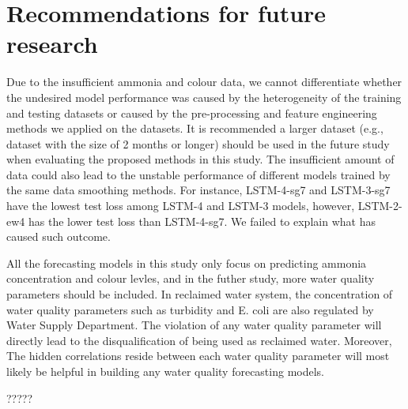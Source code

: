 \section{Recommendations for future research}
Due to the insufficient ammonia and colour data, we cannot differentiate whether the undesired model performance was caused by the heterogeneity of the training and testing datasets or caused by the pre-processing and feature engineering methods we applied on the datasets. It is recommended a larger dataset (e.g., dataset with the size of 2 months or longer) should be used in the future study when evaluating the proposed methods in this study. The insufficient amount of data could also lead to the unstable performance of different models trained by the same data smoothing methods. For instance, LSTM-4-sg7 and LSTM-3-sg7 have the lowest test loss among LSTM-4 and LSTM-3 models, however, LSTM-2-ew4 has the lower test loss than LSTM-4-sg7. We failed to explain what has caused such outcome. 

All the forecasting models in this study only focus on predicting ammonia concentration and colour levles, and in the futher study, more water quality parameters should be included. In reclaimed water system, the concentration of water quality parameters such as turbidity and E. coli are also regulated by Water Supply Department. The violation of any water quality parameter will directly lead to the disqualification of being used as reclaimed water. Moreover, The hidden correlations reside between each water quality parameter will most likely be helpful in building any water quality forecasting models.

?????